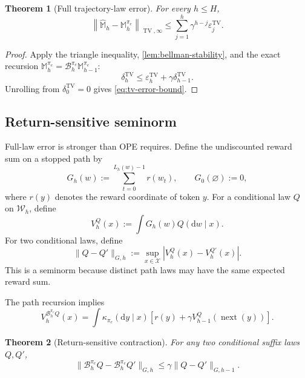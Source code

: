 \documentclass[11pt]{article}
\newtheorem{theorem}{Theorem}
\theoremstyle{definition}
\theoremstyle{remark}
\newcommand{\Xspace}{\mathcal X}
\newcommand{\Wspace}{\mathcal W}
\newcommand{\TV}{\operatorname{TV}}
\newcommand{\nextx}{\operatorname{next}}
\newcommand{\dd}{\mathrm d}
\newcommand{\Bell}{\mathcal B}
\newcommand{\targetpi}{\pi_e}
\begin{document}
\begin{theorem}[Full trajectory-law error]
\label{thm:tv-error}
For every $h\leq H$,
\begin{equation}
\boxed{
\left\|
\widehat{\mathbb M}_h-\mathbb M_h^{\targetpi}
\right\|_{\TV,\infty}
\leq
\sum_{j=1}^{h}\gamma^{h-j}\varepsilon_j^{\TV}.
}
\label{eq:tv-error-bound}
\end{equation}
\end{theorem}

\begin{proof}
Apply the triangle inequality, \cref{lem:bellman-stability}, and the exact
recursion
$\mathbb M_h^{\targetpi}
=\Bell_h^{\targetpi}\mathbb M_{h-1}^{\targetpi}$:
\[
\delta_h^{\TV}
\leq
\varepsilon_h^{\TV}
+
\gamma\delta_{h-1}^{\TV}.
\]
Unrolling from $\delta_0^{\TV}=0$ gives
\cref{eq:tv-error-bound}.
\end{proof}

\subsection{Return-sensitive seminorm}

Full-law error is stronger than OPE requires. Define the undiscounted reward
sum on a stopped path by
\begin{equation}
G_h(w)
:=
\sum_{t=0}^{L_h(w)-1}r(w_t),
\qquad
G_0(\varnothing):=0,
\label{eq:return-functional}
\end{equation}
where $r(y)$ denotes the reward coordinate of token $y$. For a conditional law
$Q$ on $\Wspace_h$, define
\begin{equation}
V_h^Q(x)
:=
\int G_h(w)Q(\dd w\mid x).
\label{eq:law-value}
\end{equation}
For two conditional laws, define
\begin{equation}
\boxed{
\|Q-Q'\|_{G,h}
:=
\sup_{x\in\Xspace}
\left|
V_h^Q(x)-V_h^{Q'}(x)
\right|.
}
\label{eq:g-seminorm}
\end{equation}
This is a seminorm because distinct path laws may have the same expected
reward sum.

The path recursion implies
\begin{equation}
\boxed{
V_h^{\Bell_h^{\targetpi}Q}(x)
=
\int\kappa_{\targetpi}(\dd y\mid x)
\left[
r(y)
+
\gamma V_{h-1}^{Q}(\nextx(y))
\right].
}
\label{eq:value-bellman-recursion}
\end{equation}

\begin{theorem}[Return-sensitive contraction]
\label{thm:g-contraction}
For any two conditional suffix laws $Q,Q'$,
\begin{equation}
\boxed{
\|\Bell_h^{\targetpi}Q-\Bell_h^{\targetpi}Q'\|_{G,h}
\leq
\gamma\|Q-Q'\|_{G,h-1}.
}
\label{eq:g-contraction}
\end{equation}
\end{theorem}
\end{document}
